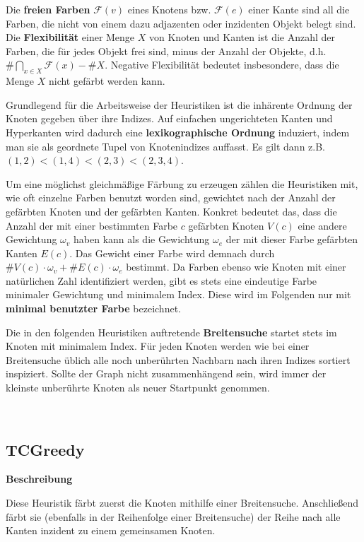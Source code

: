 \documentclass{article}
\begin{document}
	Die \textbf{freien Farben} $\mathcal F(v)$ eines Knotens bzw. $\mathcal F(e)$ einer Kante sind all die Farben, die nicht von einem dazu adjazenten oder inzidenten Objekt belegt sind. Die \textbf{Flexibilität} einer Menge $X$ von Knoten und Kanten ist die Anzahl der Farben, die für jedes Objekt frei sind, minus der Anzahl der Objekte, d.h. $\# \bigcap \limits_{x \in X} \mathcal F(x) - \# X$. Negative Flexibilität bedeutet insbesondere, dass die Menge $X$ nicht gefärbt werden kann.
	
	Grundlegend für die Arbeitsweise der Heuristiken ist die inhärente Ordnung der Knoten gegeben über ihre Indizes. Auf einfachen ungerichteten Kanten und Hyperkanten wird dadurch eine \textbf{lexikographische Ordnung} induziert, indem man sie als geordnete Tupel von Knotenindizes auffasst. Es gilt dann z.B. $(1,2) < (1,4) < (2, 3) < (2,3,4)$.
	
	Um eine möglichst gleichmäßige Färbung zu erzeugen zählen die Heuristiken mit, wie oft einzelne Farben benutzt worden sind, gewichtet nach der Anzahl der gefärbten Knoten und der gefärbten Kanten. Konkret bedeutet das, dass die Anzahl der mit einer bestimmten Farbe $c$ gefärbten Knoten $V(c)$ eine andere Gewichtung $\omega_v$ haben kann als die Gewichtung $\omega_e$ der mit dieser Farbe gefärbten Kanten $E(c)$. Das Gewicht einer Farbe wird demnach durch $\# V(c) \cdot \omega_v + \# E(c) \cdot \omega_e$ bestimmt. Da Farben ebenso wie Knoten mit einer natürlichen Zahl identifiziert werden, gibt es stets eine eindeutige Farbe minimaler Gewichtung und minimalem Index. Diese wird im Folgenden nur mit \textbf{minimal benutzter Farbe} bezeichnet.
	
	Die in den folgenden Heuristiken auftretende \textbf{Breitensuche} startet stets im Knoten mit minimalem Index. Für jeden Knoten werden wie bei einer Breitensuche üblich alle noch unberührten Nachbarn nach ihren Indizes sortiert inspiziert. Sollte der Graph nicht zusammenhängend sein, wird immer der kleinste unberührte Knoten als neuer Startpunkt genommen.
	
	
	~\newpage
	\subsection{TCGreedy}
	
	\textbf{Beschreibung}
	
	Diese Heuristik färbt zuerst die Knoten mithilfe einer Breitensuche. Anschließend färbt sie (ebenfalls in der Reihenfolge einer Breitensuche) der Reihe nach alle Kanten inzident zu einem gemeinsamen Knoten.
	
\end{document}
